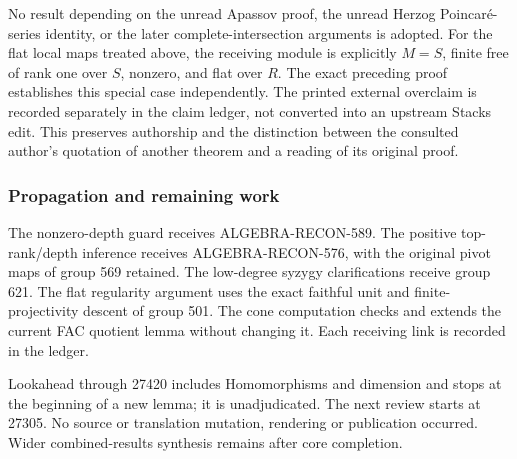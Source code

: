 No result depending on the unread Apassov proof, the unread Herzog Poincaré-series identity, or the later complete-intersection arguments is adopted. For the flat local maps treated above, the receiving module is explicitly \(M=S\), finite free of rank one over \(S\), nonzero, and flat over \(R\). The exact preceding proof establishes this special case independently. The printed external overclaim is recorded separately in the claim ledger, not converted into an upstream Stacks edit. This preserves authorship and the distinction between the consulted author's quotation of another theorem and a reading of its original proof.

\subsubsection{Propagation and remaining work}\label{algebra-proof-023-propagation-and-remaining-work}

The nonzero-depth guard receives ALGEBRA-\AlgebraIdentifierBreak{}RECON-\AlgebraIdentifierBreak{}589. The positive top-rank/depth inference receives ALGEBRA-\AlgebraIdentifierBreak{}RECON-\AlgebraIdentifierBreak{}576, with the original pivot maps of group 569 retained. The low-degree syzygy clarifications receive group 621. The flat regularity argument uses the exact faithful unit and finite-projectivity descent of group 501. The cone computation checks and extends the current FAC quotient lemma without changing it. Each receiving link is recorded in the ledger.

Lookahead through 27420 includes Homomorphisms and dimension and stops at the beginning of a new lemma; it is unadjudicated. The next review starts at 27305. No source or translation mutation, rendering or publication occurred. Wider combined-results synthesis remains after core completion.
